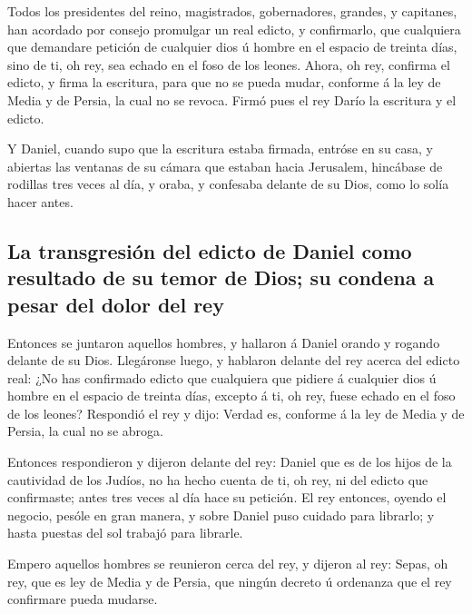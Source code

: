  Todos los presidentes del reino, magistrados,
gobernadores, grandes, y capitanes, han acordado por consejo promulgar
un real edicto, y confirmarlo, que cualquiera que demandare petición de
cualquier dios ú hombre en el espacio de treinta días, sino de ti, oh
rey, sea echado en el foso de los leones.  Ahora, oh rey,
confirma el edicto, y firma la escritura, para que no se pueda mudar,
conforme á la ley de Media y de Persia, la cual no se revoca.
 Firmó pues el rey Darío la escritura y el edicto.

 Y Daniel, cuando supo que la escritura estaba firmada,
entróse en su casa, y abiertas las ventanas de su cámara que estaban
hacia Jerusalem, hincábase de rodillas tres veces al día, y oraba, y
confesaba delante de su Dios, como lo solía hacer antes.

\hypertarget{la-transgresiuxf3n-del-edicto-de-daniel-como-resultado-de-su-temor-de-dios-su-condena-a-pesar-del-dolor-del-rey}{%
\subsection{La transgresión del edicto de Daniel como resultado de su
temor de Dios; su condena a pesar del dolor del
rey}\label{la-transgresiuxf3n-del-edicto-de-daniel-como-resultado-de-su-temor-de-dios-su-condena-a-pesar-del-dolor-del-rey}}

 Entonces se juntaron aquellos hombres, y hallaron á
Daniel orando y rogando delante de su Dios.  Llegáronse
luego, y hablaron delante del rey acerca del edicto real: ¿No has
confirmado edicto que cualquiera que pidiere á cualquier dios ú hombre
en el espacio de treinta días, excepto á ti, oh rey, fuese echado en el
foso de los leones? Respondió el rey y dijo: Verdad es, conforme á la
ley de Media y de Persia, la cual no se abroga.

 Entonces respondieron y dijeron delante del rey: Daniel
que es de los hijos de la cautividad de los Judíos, no ha hecho cuenta
de ti, oh rey, ni del edicto que confirmaste; antes tres veces al día
hace su petición.  El rey entonces, oyendo el negocio,
pesóle en gran manera, y sobre Daniel puso cuidado para librarlo; y
hasta puestas del sol trabajó para librarle.

 Empero aquellos hombres se reunieron cerca del rey, y
dijeron al rey: Sepas, oh rey, que es ley de Media y de Persia, que
ningún decreto ú ordenanza que el rey confirmare pueda mudarse.

